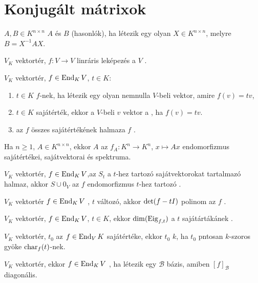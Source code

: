 \section{Konjugált mátrixok}
\begin{ff}
	$A,B\in K^{n\times n}$ $A$ és $B$ 
	(hasonlók), ha létezik egy olyan $X\in K^{n\times n}$, melyre
	$B=X^{-1}AX$.
\end{ff}
\begin{ff}
	$V_K$ vektortér, $f:V\to V$ linráris leképezés a $V$
	.
\end{ff}
\begin{jel}
\end{jel}
\begin{ff}
	$V_K$ vektortér, $f\in \operatorname{End}_KV$, $t\in K$:
	\begin{enumerate}
		\item $t\in K$  $f$-nek, ha létezik
			egy olyan nemnulla $V$-beli vektor, amire $f(v)=tv$,
		\item $t\in K$ sajátérték, ekkor a $V$-beli $v$ vektor a
			, ha $f(v)=tv$.
		\item az $f$ összes sajátértékének halmaza $f$
			.
	\end{enumerate}
\end{ff}
\begin{ff}
	Ha $n\ge 1$, $A\in K^{n\times n}$, ekkor $A$  az $f_A:K^n\to K^n$, $x\mapsto Ax$
	endomorfizmus sajátértékei, sajátvektorai és spektruma.
\end{ff}
\begin{ff}
	$V_K$ vektortér, $f\in \operatorname{End}_KV$,az $S_t$ a $t$-hez tartozó sajátvektorokat tartalmazó
	halmaz, akkor $S\cup {0_V}$ az $f$ endomorfizmus $t$-hez tartozó
	.
\end{ff}
\begin{jel}
\end{jel}
\begin{ff}
	$V_K$ vektortér $f\in \operatorname{End}_KV$ , $t$ változó, akkor $\operatorname{det}(f-tI)$ 
	polinom az $f$ .
\end{ff}
\begin{jel}
\end{jel}
\begin{ff}
	$V_K$ vektortér, $f\in \operatorname{End}_KV$, $t\in K$, ekkor $\operatorname{dim}(\operatorname{Eig}_{f,t})$ a $t$ 
	sajátártákánek .
\end{ff}
\begin{ff}
	$V_K$ vektortér, $t_0$ az $f\in\operatorname{End}_VK$ sajátértéke, ekkor $t_0$  $k$, ha $t_0$ pntosan $k$-szoros gyöke $\operatorname{char}_f(t)$-nek.
\end{ff}
\begin{ff}
	$V_K$ vektortér, ekkor $f\in\operatorname{End}_KV$ , ha létezik egy
	$\mathcal{B}$ bázis, amiben $[f]_{\mathcal{B}}$ diagonális.
\end{ff}

